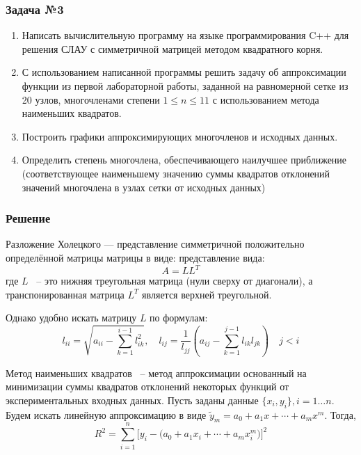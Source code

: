 \documentclass[a4paper, fontsize=14pt]{article}
\begin{document}
\subsubsection*{Задача №3}
\begin{enumerate}
    \item Написать вычислительную программу на языке программирования C++
    для решения СЛАУ с симметричной матрицей методом квадратного
    корня.
    \item С использованием написанной программы решить задачу об
    аппроксимации функции из первой лабораторной работы, заданной на
    равномерной сетке из 20 узлов, многочленами степени $1 \leq n \leq 11$ с
    использованием метода наименьших квадратов.
    \item Построить графики аппроксимирующих многочленов и исходных
    данных.
    \item Определить степень многочлена, обеспечивающего наилучшее
    приближение (соответствующее наименьшему значению суммы
    квадратов отклонений значений многочлена в узлах сетки от исходных
    данных)
\end{enumerate}
\subsubsection*{Решение}
Разложение Холецкого — представление симметричной положительно определённой матрицы матрицы в виде:
представление вида:
\begin{equation*}
    A = L L^T
\end{equation*}
где $L$ ~-- это нижняя треугольная матрица (нули сверху от
диагонали), а транспонированная матрица $L^T$ является верхней
треугольной. 

Однако удобно искать матрицу $L$ по формулам:
\begin{equation*}
    l_{ii} = \sqrt{a_{ii} - \sum_{k=1}^{i-1} l^2_{ik}}, \quad l_{ij} = \frac{1}{l_{jj}} \left( a_{ij} - \sum_{k=1}^{j-1} l_{ik} l_{jk}\right) \quad j < i
\end{equation*}

Метод наименьших квадратов ~-- метод аппроксимации основанный на минимизации суммы квадратов отклонений некоторых функций от экспериментальных входных данных. 
Пусть заданы данные $\{ x_i, y_i\}, i = 1 \dots n$. Будем искать линейную аппроксимацию в виде $\tilde{y}_m = a_0 + a_1 x + \cdots + a_m x^m$. Тогда,
\begin{equation*}
    R^2 = \sum_{i=1}^n \biggr[ y_i - \bigr(a_0 + a_1 x_i + \cdots + a_m x_i^m\bigr)\biggr]^2
\end{equation*}
\end{document}
